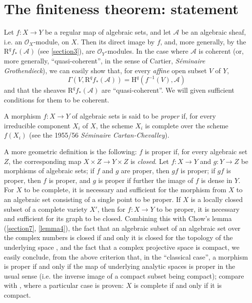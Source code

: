 \documentclass{article}
\theoremstyle{plain}
\theoremstyle{definition}
\newenvironment{definition}[1]
    {\renewcommand\theinnercustomdefinition{#1}\innercustomdefinition}
    {\endinnercustomdefinition}
\newcommand{\sh}[1]{{\mathscr{#1}}}
\newcommand{\HH}{\mathrm{H}}
\newcommand{\RR}{\mathrm{R}}
\newcommand{\oldpage}[1]{\marginpar{\footnotesize$\Big\vert$ \textit{p.~#1}}}
\begin{document}
\section{The finiteness theorem: statement}
\label{section5}

Let $f\colon X\to Y$ be a regular map of algebraic sets, and let $\sh{A}$ be an algebraic sheaf, i.e. an $\sh{O}_X$-module, on $X$.
Then its direct image by $f$, and, more generally, by the $\RR^qf_*(\sh{A})$ (see \cref{section3}), are $\sh{O}_Y$-modules.
In the case where $\sh{A}$ is coherent (or, more generally, ``quasi-coherent'', in the sense of Cartier, \emph{S\'{e}minaire Grothendieck}), we can easily show that, for every \emph{affine} open subset $V$ of $Y$,
\[
  \Gamma(V,\RR^qf_*(\sh{A})) = \HH^q(f^{-1}(V),\sh{A})
\]
and that the sheaves $\RR^qf_*(\sh{A})$ are ``quasi-coherent''.
We will given sufficient conditions for them to be coherent.

\begin{definition}{2}
\label{definition2}
  A morphism $f\colon X\to Y$ of algebraic sets is said to be \emph{proper} if, for every irreducible component $X_i$ of $X$, the scheme $X_i$ is complete over the scheme $f(X_i)$ (see the 1955/56 \emph{S\'{e}minaire Cartan-Chevalley}).
\end{definition}

A more geometric definition is the following: $f$ is proper if, for every algebraic set $Z$, the corresponding map $X\times Z\to Y\times Z$ is \emph{closed}.
Let $f\colon X\to Y$ and $g\colon Y\to Z$ be morphisms of algebraic sets;
if $f$ and $g$ are proper, then $gf$ is proper;
if $gf$ is proper, then $f$ is proper, and $g$ is proper if further the image of $f$ is dense in $Y$.
For $X$ to be complete, it is necessary and sufficient for the morphism from $X$ to an algebraic set consisting of a single point to be proper.
If $X$ is a locally closed subset of a complete variety $X'$, then for $f\colon X\to Y$ to be proper, it is necessary and sufficient for its graph to be closed.
Combining this with Chow's lemma (\cref{section7}, \cref{lemma4}), the fact that an algebraic subset of an algebraic set over the complex numbers is closed if and only it is closed for the topology of the underlying space \cite[proposition~7, page~12]{2}, and the fact that a complex projective space is compact, we easily conclude, from the
\oldpage{2-08}
above criterion that, in the ``classical case'', a morphism is proper if and only if the map of underlying analytic spaces is proper in the usual sense (i.e. the inverse image of a compact subset being compact);
compare with \cite[proposition~12, proposition~6]{2}, where a particular case is proven: $X$ is complete if and only if it is compact.
\end{document}
